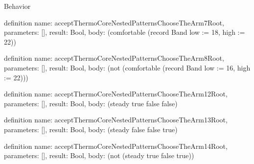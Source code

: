 \begin{lexlean}{Behavior}
\begin{semanticmodule}
definition{
  name: acceptThermoCoreNestedPatternsChooseTheArm7Root,
  parameters: [],
  result: Bool,
  body: (comfortable (record Band {low := 18, high := 22}))
}

definition{
  name: acceptThermoCoreNestedPatternsChooseTheArm8Root,
  parameters: [],
  result: Bool,
  body: (not (comfortable (record Band {low := 16, high := 22})))
}

definition{
  name: acceptThermoCoreNestedPatternsChooseTheArm12Root,
  parameters: [],
  result: Bool,
  body: (steady true false false)
}

definition{
  name: acceptThermoCoreNestedPatternsChooseTheArm13Root,
  parameters: [],
  result: Bool,
  body: (steady false false true)
}

definition{
  name: acceptThermoCoreNestedPatternsChooseTheArm14Root,
  parameters: [],
  result: Bool,
  body: (not (steady true false true))
}
\end{semanticmodule}
\end{lexlean}
